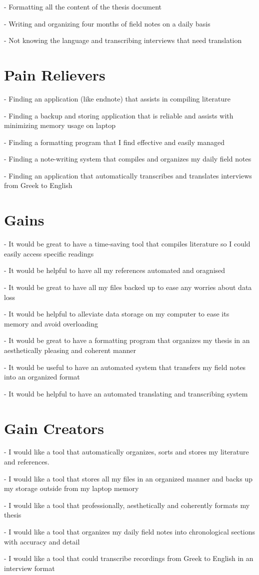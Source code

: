 \documentclass{article}
\begin{document}
- Formatting all the content of the thesis document 

- Writing and organizing four months of field notes on a daily basis

- Not knowing the language and transcribing interviews that need translation

\section{Pain Relievers}

- Finding an application (like endnote) that assists in compiling literature

- Finding a backup and storing application that is reliable and assists with minimizing memory usage on laptop

- Finding a formatting program that I find effective and easily managed

- Finding a note-writing system that compiles and organizes my daily field notes

- Finding an application that automatically transcribes and translates interviews from Greek to English

\section{Gains}

- It would be great to have a time-saving tool that compiles literature so I could easily access specific readings

- It would be helpful to have all my references automated and oragnised

- It would be great to have all my files backed up to ease any worries about data loss

- It would be helpful to alleviate data storage on my computer to ease its memory and avoid overloading

- It would be great to have a formatting program that organizes my thesis in an aesthetically pleasing and coherent manner

- It would be useful to have an automated system that transfers my field notes into an organized format

- It would be helpful to have an automated translating and transcribing system 

\section{Gain Creators}

- I would like a tool that automatically organizes, sorts and stores my literature and references.

- I would like a tool that stores all my files in an organized manner and backs up my storage outside from my laptop memory

- I would like a tool that professionally, aesthetically and coherently formats my thesis

- I would like a tool that organizes my daily field notes into chronological sections with accuracy and detail

- I would like a tool that could transcribe recordings from Greek to English in an interview format
\end{document}
